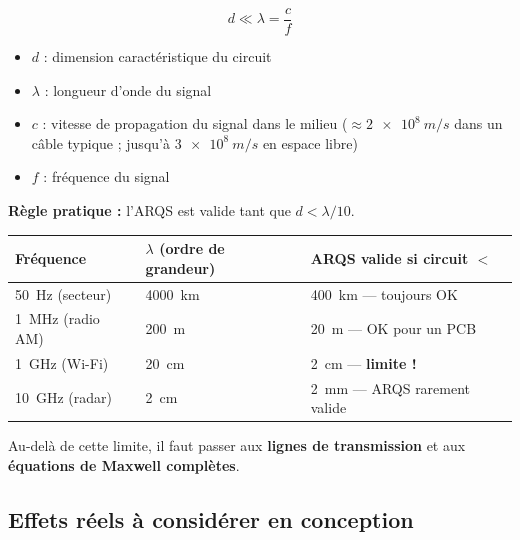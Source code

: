 \documentclass[12pt,a4paper,twoside]{book}
\begin{document}
\begin{formule}
\[
\boxed{d \ll \lambda = \frac{c}{f}}
\]
\begin{itemize}[nosep]
\item $d$ : dimension caractéristique du circuit
\item $\lambda$ : longueur d'onde du signal
\item $c$ : vitesse de propagation du signal dans le milieu ($\approx \SI{2e8}{m/s}$ dans un câble typique ; jusqu'à $\SI{3e8}{m/s}$ en espace libre)
\item $f$ : fréquence du signal
\end{itemize}
\end{formule}

\textbf{Règle pratique :} l'ARQS est valide tant que $d < \lambda / 10$.

\begin{center}
\begin{tabular}{lll}
\toprule
\textbf{Fréquence} & \textbf{$\lambda$ (ordre de grandeur)} & \textbf{ARQS valide si circuit $<$} \\
\midrule
\SI{50}{Hz} (secteur) & \SI{4000}{km} & \SI{400}{km} — toujours OK \\
\SI{1}{MHz} (radio AM) & \SI{200}{m} & \SI{20}{m} — OK pour un PCB \\
\SI{1}{GHz} (Wi-Fi) & \SI{20}{cm} & \SI{2}{cm} — \textbf{limite !} \\
\SI{10}{GHz} (radar) & \SI{2}{cm} & \SI{2}{mm} — ARQS rarement valide \\
\bottomrule
\end{tabular}
\end{center}

Au-delà de cette limite, il faut passer aux \textbf{lignes de transmission} et aux \textbf{équations de Maxwell complètes}.

\subsection{Effets réels à considérer en conception}
\end{document}
